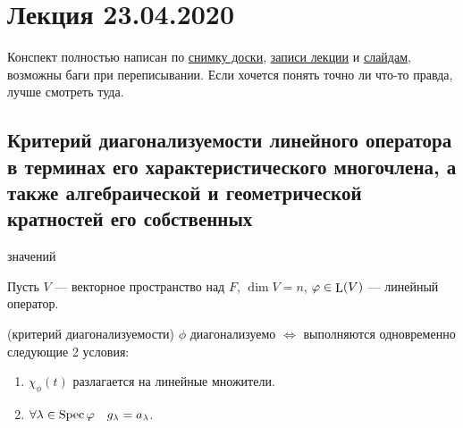 \section{Лекция 23.04.2020} 

Конспект полностью написан по
\href{https://www.dropbox.com/s/ze7leityir3zbqo/LA_19-20_osn_Lecture29.svg?dl=0}{снимку доски}, 
\href{https://www.youtube.com/watch?v=_J8hatdsSrM}{записи лекции} и
\href{https://www.dropbox.com/s/as7uz9v74ba9u5f/LinOperators2.pdf?dl=0}{слайдам},
возможны баги при переписывании. Если хочется понять точно ли что-то правда, лучше смотреть туда.


\subsection{Критерий диагонализуемости линейного оператора в терминах его характеристического многочлена, а также алгебраической и геометрической кратностей его собственных }значений

Пусть $V$ --- векторное пространство над $F$, $\dim V = n$, $\varphi \in \operatorname{\mathop{\mathrm{L}}}(V)$ --- линейный оператор.

\begin{theorem}{(критерий диагонализуемости)}
    $\phi$ диагонализуемо $\iff$ выполняются одновременно следующие 2 условия:
    \begin{enumerate}
    \item $\chi_\phi(t)$ разлагается на линейные множители.
    \item $\forall \lambda \in \operatorname{\mathop{\mathrm{Spec}}} \varphi \quad g_\lambda = a_\lambda$.
    \end{enumerate}
\end{theorem}

